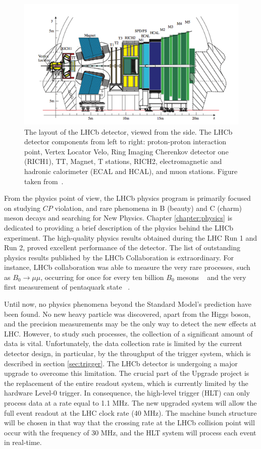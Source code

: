 \begin{figure}
\centering
\includegraphics[scale=0.6]{figures/lhcblayout.png}
\caption{The layout of the LHCb detector, viewed from the side. The LHCb detector components from left to right: proton-proton interaction point, Vertex Locator Velo, Ring Imaging Cherenkov detector one (RICH1), TT, Magnet, T stations, RICH2, electromagnetic and hadronic calorimeter (ECAL and HCAL), and muon stations. Figure taken from~\cite{lhcb}. 
\label{fig:LHCBlayout}}
\end{figure}



From the physics point of view, the LHCb physics program is primarily focused on studying $CP$ violation, and rare phenomena in B (beauty) and C (charm) meson decays and searching for New Physics. Chapter \ref{chapter:physics} is dedicated to providing a brief description of the physics behind the LHCb experiment.  
The high-quality physics results obtained during the LHC Run 1 and Run 2, proved excellent performance of the detector.
The list of outstanding physics results published by the LHCb Collaboration is extraordinary. For instance, LHCb collaboration was able to measure the very rare processes, such as $B_0\rightarrow \mu \mu$, occurring for once for every ten billion $B_0$ mesons ~\cite{B_mumu} and the very first measurement of pentaquark state ~\cite{pentaquarks}.  
  
Until now, no physics phenomena beyond the Standard Model's prediction have been found. No new heavy particle was discovered, apart from the Higgs boson, and the precision measurements may be the only way to detect the new effects at LHC. However, to study such processes, the collection of a significant amount of data is vital. Unfortunately, the data collection rate is limited by the current detector design, in particular, by the throughput of the trigger system, which is described in section \ref{sec:trigger}. The LHCb detector is undergoing a major upgrade to overcome this limitation. The crucial part of the Upgrade project is the replacement of the entire readout system, which is currently limited by the hardware Level-0 trigger.
In consequence, the high-level trigger (HLT) can only process data at a rate equal to 1.1 MHz. The new upgraded system will allow the full event readout at the LHC clock rate (40 MHz). The machine bunch structure will be chosen in that way that the crossing rate at the LHCb collision point will occur with the frequency of 30 MHz, and the HLT system will process each event in real-time.

